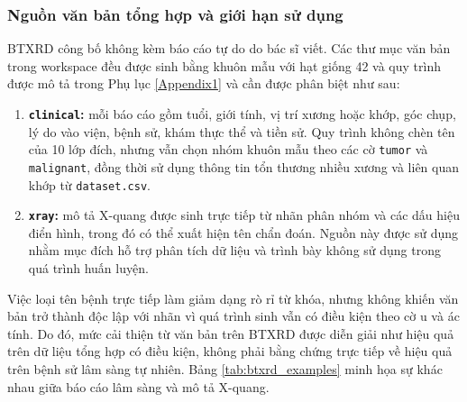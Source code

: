 \subsubsection{Nguồn văn bản tổng hợp và giới hạn sử dụng}
BTXRD công bố không kèm báo cáo tự do do bác sĩ viết. Các thư mục văn bản trong
workspace đều được sinh bằng khuôn mẫu với hạt giống 42 và quy trình được mô tả trong Phụ lục \ref{Appendix1} và cần được phân biệt như sau:
\begin{enumerate}
    \item \textbf{\texttt{clinical}:} mỗi báo cáo gồm tuổi,
    giới tính, vị trí xương hoặc khớp, góc chụp, lý do vào viện, bệnh sử, khám
    thực thể và tiền sử. Quy trình không chèn tên của 10 lớp đích, nhưng vẫn chọn nhóm khuôn mẫu theo các cờ \texttt{tumor} và \texttt{malignant}, đồng thời sử dụng thông tin tổn thương nhiều xương và liên quan khớp từ
    \texttt{dataset.csv}.
    \item \textbf{\texttt{xray}:} mô tả X-quang được sinh trực tiếp từ
    nhãn phân nhóm và các dấu hiệu điển hình, trong đó có thể xuất hiện tên chẩn đoán. Nguồn này được sử dụng nhằm mục đích hỗ trợ phân tích dữ liệu và trình bày không sử dụng trong quá trình huấn luyện.
\end{enumerate}

Việc loại tên bệnh trực tiếp làm giảm dạng rò rỉ từ khóa, nhưng không khiến văn bản trở thành độc lập với nhãn vì quá trình sinh vẫn có điều kiện theo cờ u và ác tính. Do đó, mức cải thiện từ văn bản trên BTXRD được diễn giải như hiệu quả trên dữ liệu tổng hợp có điều kiện, không phải bằng chứng trực tiếp về hiệu quả trên bệnh sử lâm sàng tự nhiên. Bảng \ref{tab:btxrd_examples} minh họa sự khác nhau giữa báo cáo lâm sàng và mô tả X-quang.

